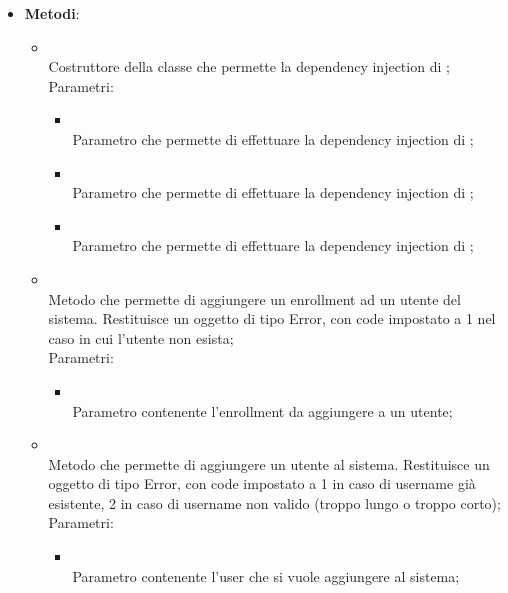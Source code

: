 \begin{itemize}
	\item \textbf{Metodi}:
	\begin{itemize}
		\item[]  \\
		Costruttore della classe  che permette la dependency injection di ;\\
		Parametri:
		\begin{itemize}
			\item {} \\
			Parametro che permette di effettuare la dependency injection di ;
			\item {} \\
			Parametro che permette di effettuare la dependency injection di ;
			\item {} \\
			Parametro che permette di effettuare la dependency injection di ;
		\end{itemize}
		\item[]  \\
		Metodo che permette di aggiungere un enrollment ad un utente del sistema. Restituisce un oggetto di tipo Error, con code impostato a 1 nel caso in cui l'utente non esista;\\
		Parametri:
		\begin{itemize}
			\item {} \\
			Parametro contenente l'enrollment da aggiungere a un utente;
		\end{itemize}
		\item[]  \\
		Metodo che permette di aggiungere un utente al sistema. Restituisce un oggetto di tipo Error, con code impostato a 1 in caso di username già esistente, 2 in caso di username non valido (troppo lungo o troppo corto);\\
		Parametri:
		\begin{itemize}
			\item {} \\
			Parametro contenente l'user che si vuole aggiungere al sistema;
		\end{itemize}

\end{itemize}
\end{itemize}
